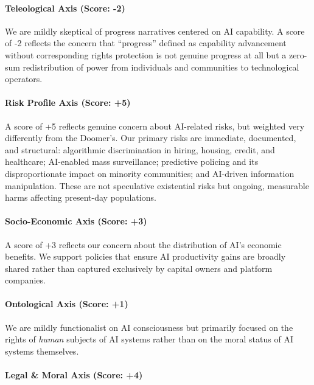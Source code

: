 \paragraph{Teleological Axis (Score:
-2)}\label{teleological-axis-score--2-2}

We are mildly skeptical of progress narratives centered on AI
capability. A score of -2 reflects the concern that ``progress'' defined
as capability advancement without corresponding rights protection is not
genuine progress at all but a zero-sum redistribution of power from
individuals and communities to technological operators.

\paragraph{Risk Profile Axis (Score:
+5)}\label{risk-profile-axis-score-5-1}

A score of +5 reflects genuine concern about AI-related risks, but
weighted very differently from the Doomer's. Our primary risks are
immediate, documented, and structural: algorithmic discrimination in
hiring, housing, credit, and healthcare; AI-enabled mass surveillance;
predictive policing and its disproportionate impact on minority
communities; and AI-driven information manipulation. These are not
speculative existential risks but ongoing, measurable harms affecting
present-day populations.

\paragraph{Socio-Economic Axis (Score:
+3)}\label{socio-economic-axis-score-3-5}

A score of +3 reflects our concern about the distribution of AI's
economic benefits. We support policies that ensure AI productivity gains
are broadly shared rather than captured exclusively by capital owners
and platform companies.

\paragraph{Ontological Axis (Score: +1)}\label{ontological-axis-score-1}

We are mildly functionalist on AI consciousness but primarily focused on
the rights of \emph{human} subjects of AI systems rather than on the
moral status of AI systems themselves.

\paragraph{Legal \& Moral Axis (Score:
+4)}\label{legal-moral-axis-score-4-3}

